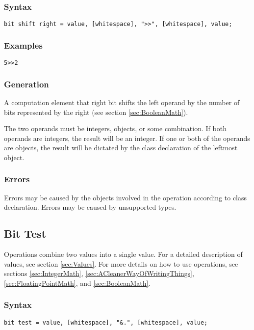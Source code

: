 \documentclass[10pt,a4paper]{article}
\begin{document}
\subsubsection{Syntax}
\begin{verbatim}
bit shift right = value, [whitespace], ">>", [whitespace], value;
\end{verbatim}

\subsubsection{Examples}
\begin{verbatim}
5>>2
\end{verbatim}

\subsubsection{Generation}
A computation element that right bit shifts the left operand by the number of bits represented by the right (see section \ref{sec:BooleanMath}).

The two operands must be integers, objects, or some combination. If both operands are integers, the result will be an integer. If one or both of the operands are objects, the result will be dictated by the class declaration of the leftmost object.

\subsubsection{Errors}
Errors may be caused by the objects involved in the operation according to class declaration. Errors may be caused by unsupported types.

\newpage




\subsection{Bit Test}
Operations combine two values into a single value. For a detailed description of values, see section \ref{sec:Values}. For more details on how to use operations, see sections \ref{sec:IntegerMath}, \ref{sec:ACleanerWayOfWritingThings}, \ref{sec:FloatingPointMath}, and \ref{sec:BooleanMath}.

\subsubsection{Syntax}
\begin{verbatim}
bit test = value, [whitespace], "&.", [whitespace], value;
\end{verbatim}
\end{document}
